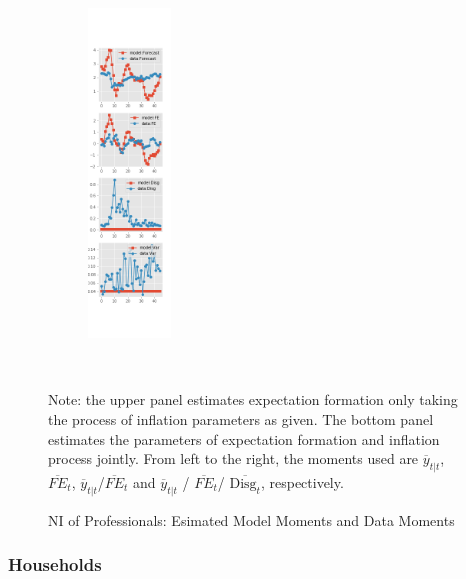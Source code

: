 \documentclass[]{article}
\begin{document}
\begin{figure}[ht]
\begin{subfigure}[b]{\textwidth}
		\includegraphics[width=0.24\textwidth]{figures/spf_ni_est_joint_diag3.png}
	\end{subfigure}
	\\
	\begin{flushleft}
		{\footnotesize Note: the upper panel estimates expectation formation only taking the process of inflation parameters as given. The bottom panel estimates the parameters of expectation formation and inflation process jointly. From left to the right, the moments used are $\overline y_{t|t}$, $\overline{FE}_{t}$, $\overline y_{t|t}$/$\overline{FE}_{t}$ and $\overline y_{t|t}$ / $\overline{FE}_{t}$/ $\overline{\textrm{Disg}_t}$, respectively. }
	\end{flushleft}
	\caption{NI of Professionals: Esimated Model Moments and Data Moments}
\end{figure}

\subsubsection{Households}
\end{document}
